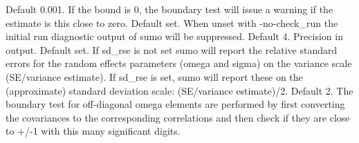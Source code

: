 \begin{optionlist}
Default 0.001. If the bound is 0, the boundary test will issue a warning if the estimate is this close to zero. 
\nextopt
{}
Default set. When unset with -no-check\_run the initial run diagnostic output of sumo will be suppressed. 
\nextopt
{}
Default 4. Precision in output.  
\nextopt
{}
Default set. If sd\_rse is not set sumo will report the relative standard errors for the random effects parameters (omega and sigma) on the variance scale (SE/variance estimate). If sd\_rse is set, sumo will report these on the (approximate) standard deviation scale: (SE/variance estimate)/2. 
\nextopt
{}
Default 2. The boundary test for off-diagonal omega elements are performed by first converting the covariances to the corresponding correlations and then check if they are close to +/-1 with this many significant digits.  
\nextopt
\end{optionlist}


